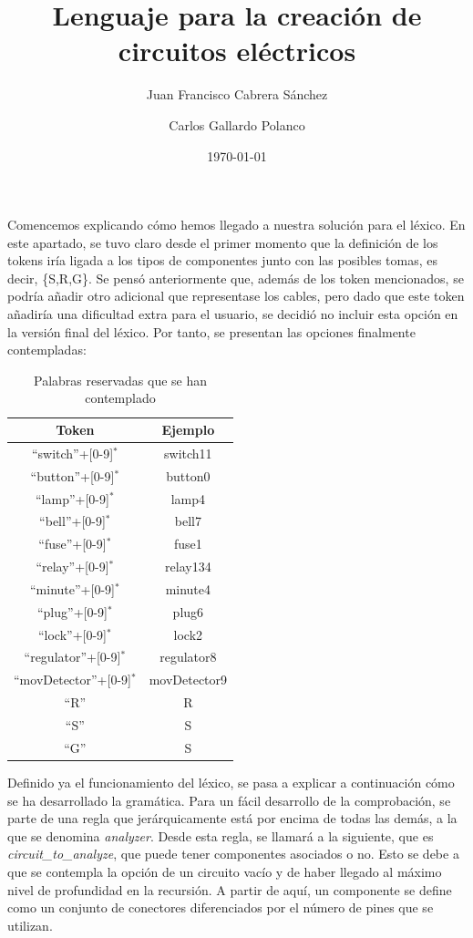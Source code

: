 \documentclass{article}
\author{Juan Francisco Cabrera Sánchez \and Carlos Gallardo Polanco}
\title{Lenguaje para la creación de circuitos eléctricos}
\date{\today}
\begin{document}
\maketitle

Comencemos explicando cómo hemos llegado a nuestra solución para el léxico. En este apartado, se tuvo claro desde el primer momento que la definición de los tokens iría ligada a los tipos de componentes junto con las posibles tomas, es decir, \{S,R,G\}. Se pensó anteriormente que, además de los token mencionados, se podría añadir otro adicional que representase los cables, pero dado que este token añadiría una dificultad extra para el usuario, se decidió no incluir esta opción en la versión final del léxico. Por tanto, se presentan las opciones finalmente contempladas:

\begin{table}[h!]
  \centering
  \begin{tabular}{|c|c|}
    \hline
    Token & Ejemplo \\ \hline
  ``switch''+[0-9]$^*$ & switch11 \\ \hline
  ``button''+[0-9]$^*$ & button0 \\ \hline
  ``lamp''+[0-9]$^*$ & lamp4 \\ \hline
  ``bell''+[0-9]$^*$ & bell7 \\ \hline
  ``fuse''+[0-9]$^*$ & fuse1 \\ \hline
  ``relay''+[0-9]$^*$ & relay134 \\ \hline
  ``minute''+[0-9]$^*$ & minute4 \\ \hline
  ``plug''+[0-9]$^*$ & plug6 \\ \hline
  ``lock''+[0-9]$^*$ & lock2 \\ \hline
  ``regulator''+[0-9]$^*$ & regulator8 \\ \hline
  ``movDetector''+[0-9]$^*$ & movDetector9 \\ \hline
  ``R'' & R \\ \hline
  ``S'' & S \\ \hline
  ``G'' & S \\ \hline
  \end{tabular}
  \caption{Palabras reservadas que se han contemplado}
  \label{}
\end{table}

Definido ya el funcionamiento del léxico, se pasa a explicar a continuación cómo se ha desarrollado la gramática. Para un fácil desarrollo de la comprobación, se parte de una regla que jerárquicamente está por encima de todas las demás, a la que se denomina \emph{analyzer}. Desde esta regla, se llamará a la siguiente, que es \emph{circuit\_to\_analyze}, que puede tener componentes asociados o no. Esto se debe a que se contempla la opción de un circuito vacío y de haber llegado al máximo nivel de profundidad en la recursión. A partir de aquí, un componente se define como un conjunto de conectores diferenciados por el número de pines que se utilizan.
\end{document}
